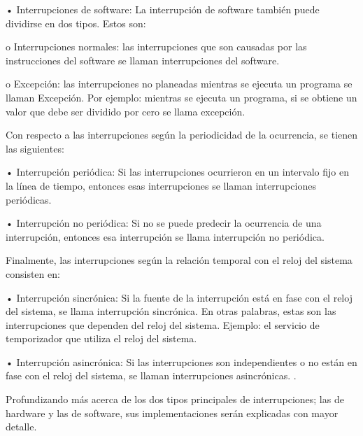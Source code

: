 \documentclass[12pt]{article}
\begin{document}
{•	Interrupciones de software: La interrupción de software también puede dividirse en dos tipos. Estos son:

\hspace{10mm}o	Interrupciones normales: las interrupciones que son causadas por las instrucciones del software se llaman interrupciones del software.
    
\hspace{10mm}o	Excepción: las interrupciones no planeadas mientras se ejecuta un programa se llaman Excepción. Por ejemplo: mientras se ejecuta un programa, si se obtiene un valor que debe ser dividido por cero se llama excepción.
\newline
    
Con respecto a las interrupciones según la periodicidad de la ocurrencia, se tienen las siguientes:
\newline

•	Interrupción periódica: Si las interrupciones ocurrieron en un intervalo fijo en la línea de tiempo, entonces esas interrupciones se llaman interrupciones periódicas.

•	Interrupción no periódica: Si no se puede predecir la ocurrencia de una interrupción, entonces esa interrupción se llama interrupción no periódica.
\newline

Finalmente, las interrupciones según la relación temporal con el reloj del sistema consisten en:
\newline

•	Interrupción sincrónica: Si la fuente de la interrupción está en fase con el reloj del sistema, se llama interrupción sincrónica. En otras palabras, estas son las interrupciones que dependen del reloj del sistema. Ejemplo: el servicio de temporizador que utiliza el reloj del sistema.

•	Interrupción asincrónica: Si las interrupciones son independientes o no están en fase con el reloj del sistema, se llaman interrupciones asincrónicas.   \citep{Tip}.
\newline

Profundizando más acerca de los dos tipos principales de interrupciones; las de hardware y las de software, sus implementaciones serán explicadas con mayor detalle. 
\newline

}
\end{document}
